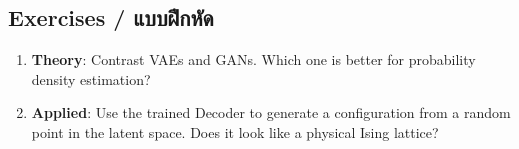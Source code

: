 \subsection{Exercises \quad / \quad \textthai{แบบฝึกหัด}}
\begin{enumerate}
    \item \textbf{Theory}: Contrast VAEs and GANs. Which one is better for probability density estimation?
    \item \textbf{Applied}: Use the trained Decoder to generate a configuration from a random point in the latent space. Does it look like a physical Ising lattice?
\end{enumerate}
